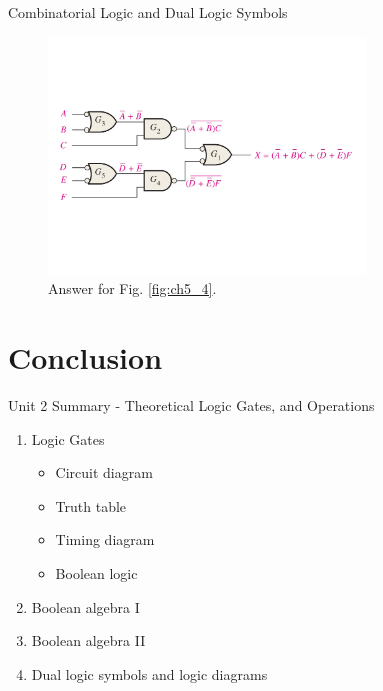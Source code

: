 \documentclass{beamer}
\begin{document}
\begin{frame}{Combinatorial Logic and Dual Logic Symbols}
\begin{figure}
\centering
\includegraphics[width=0.75\textwidth,trim=0cm 4cm 0.5cm 4cm,clip=true]{figures/ch5_4.pdf}
\caption{\label{fig:ch5_5} Answer for Fig. \ref{fig:ch5_4}.}
\end{figure}
\end{frame}

\section{Conclusion}

\begin{frame}{Unit 2 Summary - Theoretical Logic Gates, and Operations}
\begin{enumerate}
\item Logic Gates
\begin{itemize}
\item Circuit diagram
\item Truth table
\item Timing diagram
\item Boolean logic
\end{itemize}
\item \alert{Boolean algebra I}
\item \alert{Boolean algebra II}
\item Dual logic symbols and logic diagrams
\end{enumerate}
\end{frame}
\end{document}
